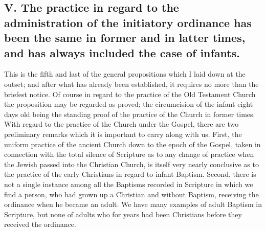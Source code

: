 \documentclass[]{book}
\begin{document}
\hypertarget{v.-the-practice-in-regard-to-the-administration-of-the-initiatory-ordinance-has-been-the-same-in-former-and-in-latter-times-and-has-always-included-the-case-of-infants.}{%
\subsection{V. The practice in regard to the administration of the initiatory ordinance has been the same in former and in latter times, and has always included the case of infants.}\label{v.-the-practice-in-regard-to-the-administration-of-the-initiatory-ordinance-has-been-the-same-in-former-and-in-latter-times-and-has-always-included-the-case-of-infants.}}

This is the fifth and last of the general propositions which I laid down at the outset; and after what has already been established, it requires no more than the briefest notice. Of course in regard to the practice of the Old Testament Church the proposition may be regarded as proved; the circumcision of the infant eight days old being the standing proof of the practice of the Church in former times. With regard to the practice of the Church under the Gospel, there are two preliminary remarks which it is important to carry along with us. First, the uniform practice of the ancient Church down to the epoch of the Gospel, taken in connection with the total silence of Scripture as to any change of practice when the Jewish passed into the Christian Church, is itself very nearly conclusive as to the practice of the early Christians in regard to infant Baptism. Second, there is not a single instance among all the Baptisms recorded in Scripture in which we find a person, who had grown up a Christian and without Baptism, receiving the ordinance when he became an adult. We have many examples of adult Baptism in Scripture, but none of adults who for years had been Christians before they received the ordinance.
\end{document}

